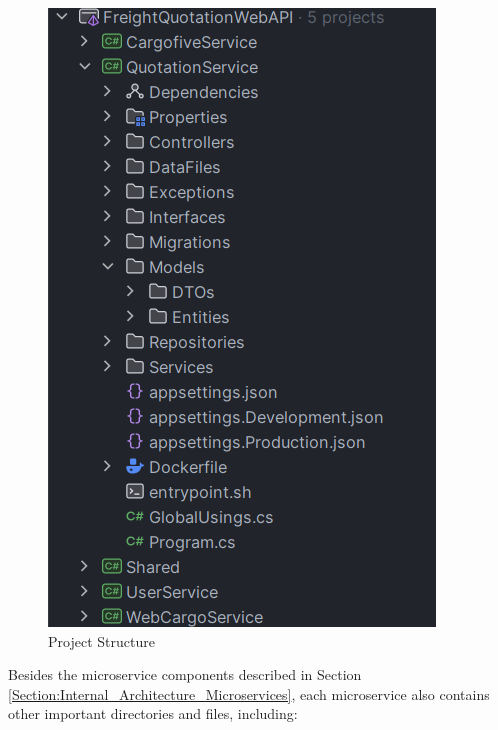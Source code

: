 \documentclass[12pt,reqno, oneside]{amsbook}
\theoremstyle{definition}
\theoremstyle{definition}
\numberwithin{section}{chapter}
\numberwithin{table}{chapter}
\numberwithin{figure}{chapter}
\begin{document}
\begin{figure}[H]
  \centering
  \includegraphics[width=0.72\linewidth]{images/ProjectStructure.png}
  \caption{\label{Figure:ProjectStructure}Project Structure}
\end{figure}

Besides the microservice components described in Section \ref{Section:Internal_Architecture_Microservices}, each microservice also contains other important directories and files, including:
\end{document}
